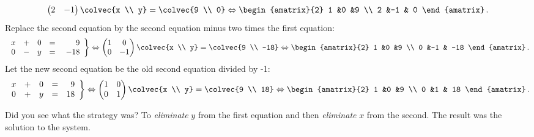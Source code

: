 \begin{example}
\[\begin{pmatrix}
      2             &-1
    \end{pmatrix}
  \colvec{x \\ y}
  =
  \colvec{9 \\ 0}
  \Leftrightarrow
 \begin{amatrix}{2}
1 &0 &9 \\ 2 &-1 & 0
\end{amatrix}\, .
\]
  Replace the second equation by the second equation minus two times the first equation: 
\[
   \left.
\begin{array}{ccccr}
	x& +& 0 & = & 9 \\
	0&-& y & = &\  -18
     \end{array}
   \right\} 
   \Leftrightarrow
    \begin{pmatrix}
      1             &0  \\
      0             &-1
    \end{pmatrix}
  \colvec{x \\ y}
  =
  \colvec{9 \\ -18}
  \Leftrightarrow
 \begin{amatrix}{2}
1 &0 &9 \\ 0 &-1 & -18
\end{amatrix}\, .
\]
Let the new  second equation be the old second equation divided by -1:
\[
   \left.
\begin{array}{ccccr}
	x &+ &0 & = & \ 9 \\
	0& + &y & = &  18
     \end{array}
   \right\} 
   \Leftrightarrow
    \begin{pmatrix}
      1             &0  \\
      0             &1
    \end{pmatrix}
  \colvec{x \\ y}
  =
  \colvec{9 \\ 18}
  \Leftrightarrow
 \begin{amatrix}{2}
1 &0 &9 \\ 0 &1 & 18
\end{amatrix}\, .
\]
\end{example}
Did you see what the strategy was? To {\itshape eliminate} $y$ from the first equation and then {\itshape eliminate} $x$ from the second. The result was  the solution to the system. 

